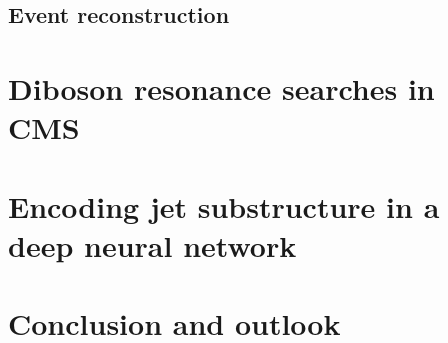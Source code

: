 \documentclass[12pt,USenglish,a4]{book}
\begin{document}
\chapter{Event reconstruction} %
\label{ch:objreco}


\part{Diboson resonance searches in CMS}
\label{ch:diboson}


\part{Encoding jet substructure in a deep neural network}
\label{ch:lola}


\part{Conclusion and outlook}	
\label{ch:summary}

\clearpage

\newpage\thispagestyle{empty}\mbox{}

\appendix
\label{app}
\vspace*{\fill}\newpage



\newpage





\end{document}
